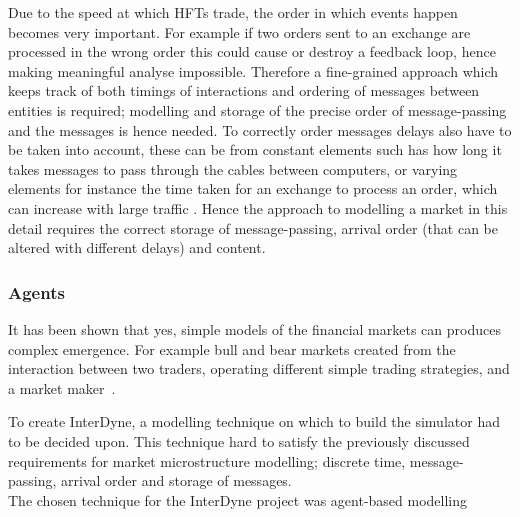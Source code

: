 \documentclass{article}
\begin{document}
Due to the speed at which HFTs trade, the order in which events happen becomes very important. For example if two orders sent to an exchange are processed in the wrong order this could cause or destroy a feedback loop, hence making meaningful analyse impossible. Therefore a fine-grained approach which keeps track of both timings of interactions and ordering of messages between entities is required; modelling and storage of the precise order of message-passing and the messages is hence needed. To correctly order messages delays also have to be taken into account, these can be from constant elements such has how long it takes messages to pass through the cables between computers, or varying elements for instance the time taken for an exchange to process an order, which can increase with large traffic \cite{SECreport_delays}. Hence the approach to modelling a market in this detail requires the correct storage of message-passing, arrival order (that can be altered with different delays) and content.


\subsubsection{Agents}





It has been shown that yes, simple models of the financial markets can produces complex emergence. For example bull and bear markets created from the interaction between two traders, operating different simple trading strategies, and a market maker~\cite{bearandbull}.

To create InterDyne, a modelling technique on which to build the simulator had to be decided upon. This technique hard to satisfy the previously discussed requirements for market microstructure modelling; discrete time, message-passing, arrival order and storage of messages.\\
The chosen technique for the InterDyne project was agent-based modelling \cite{abm1}
\end{document}
